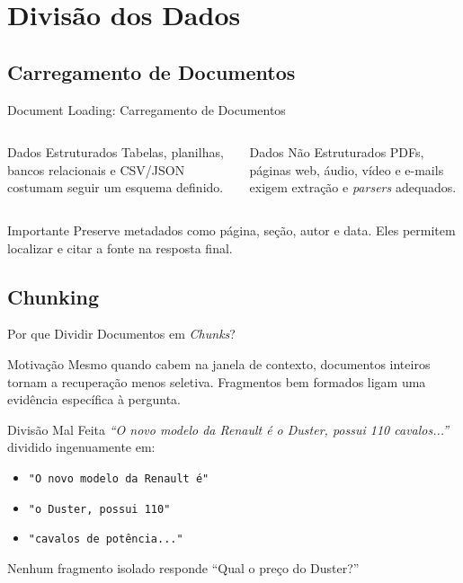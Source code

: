 \documentclass[aspectratio=169]{beamer}
\begin{document}
\section{Divisão dos Dados}

\subsection{Carregamento de Documentos}

\begin{frame}{Document Loading: Carregamento de Documentos}
    \begin{columns}
        \begin{block}{Dados Estruturados}
            \footnotesize Tabelas, planilhas, bancos relacionais e CSV/JSON costumam seguir um esquema definido.
        \end{block}
        \begin{block}{Dados Não Estruturados}
            \footnotesize PDFs, páginas web, áudio, vídeo e e-mails exigem extração e \textit{parsers} adequados.
        \end{block}
    \end{columns}
    \pause
    \begin{alertblock}{Importante}
        \footnotesize Preserve metadados como página, seção, autor e data. Eles permitem localizar e citar a fonte na resposta final.
    \end{alertblock}
\end{frame}

\subsection{Chunking}

\begin{frame}{Por que Dividir Documentos em \textit{Chunks}?}
    \begin{block}{Motivação}
        \footnotesize Mesmo quando cabem na janela de contexto, documentos inteiros tornam a recuperação menos seletiva. Fragmentos bem formados ligam uma evidência específica à pergunta.
    \end{block}
    \pause
    \begin{exampleblock}{Divisão Mal Feita}
        \footnotesize \textit{``O novo modelo da Renault é o Duster, possui 110 cavalos...''} dividido ingenuamente em:
        \begin{itemize}\footnotesize
            \item \texttt{"O novo modelo da Renault é"}
            \item \texttt{"o Duster, possui 110"}
            \item \texttt{"cavalos de potência..."}
        \end{itemize}
        Nenhum fragmento isolado responde ``Qual o preço do Duster?''
    \end{exampleblock}
\end{frame}
\end{document}
